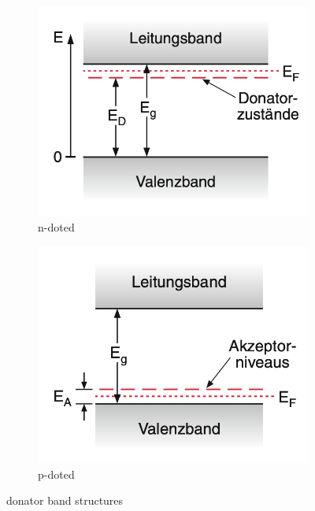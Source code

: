 \begin{figure}
    \centering
    \begin{subfigure}{0.49\textwidth}
        \includegraphics[width = \textwidth]{bilder/n_Donatorschema_demtroeder.png}
        \caption{n-doted}
    \end{subfigure}
    \hfill
    \begin{subfigure}{0.49\textwidth}
        \includegraphics[width = \textwidth]{bilder/p_Donatorschema_demtroeder.png}
        \caption{p-doted}
    \end{subfigure}
    \caption{donator band structures \cite{demtroeder}}
    \label{fig:doting}
\end{figure}

